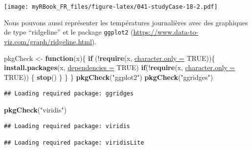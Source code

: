 \documentclass[twoside,symmetric]{book}
\newenvironment{Shaded}{}{}
\newcommand{\ControlFlowTok}[1]{\textbf{#1}}
\newcommand{\DataTypeTok}[1]{\underline{#1}}
\newcommand{\KeywordTok}[1]{\textbf{#1}}
\newcommand{\NormalTok}[1]{#1}
\newcommand{\OperatorTok}[1]{#1}
\newcommand{\OtherTok}[1]{#1}
\newcommand{\StringTok}[1]{#1}
\begin{document}
\texttt{[image: myRBook\_FR\_files/figure-latex/041-studyCase-18-2.pdf]}

Nous pouvons aussi représenter les températures journalières avec des graphiques de type ``ridgeline'' et le package \texttt{ggplot2} (\url{https://www.data-to-viz.com/graph/ridgeline.html}).

\begin{Shaded}
\begin{Highlighting}[]
\NormalTok{pkgCheck <-}\StringTok{ }\ControlFlowTok{function}\NormalTok{(x)\{ }
    \ControlFlowTok{if}\NormalTok{ (}\OperatorTok{!}\KeywordTok{require}\NormalTok{(x, }\DataTypeTok{character.only =} \OtherTok{TRUE}\NormalTok{))\{}
        \KeywordTok{install.packages}\NormalTok{(x, }\DataTypeTok{dependencies =} \OtherTok{TRUE}\NormalTok{)}
        \ControlFlowTok{if}\NormalTok{(}\OperatorTok{!}\KeywordTok{require}\NormalTok{(x, }\DataTypeTok{character.only =} \OtherTok{TRUE}\NormalTok{)) \{}
            \KeywordTok{stop}\NormalTok{()}
\NormalTok{        \}}
\NormalTok{    \}}
\NormalTok{\}}
\KeywordTok{pkgCheck}\NormalTok{(}\StringTok{"ggplot2"}\NormalTok{)}
\KeywordTok{pkgCheck}\NormalTok{(}\StringTok{"ggridges"}\NormalTok{)}
\end{Highlighting}
\end{Shaded}

\begin{verbatim}
## Loading required package: ggridges
\end{verbatim}

\begin{Shaded}
\begin{Highlighting}[]
\KeywordTok{pkgCheck}\NormalTok{(}\StringTok{"viridis"}\NormalTok{)}
\end{Highlighting}
\end{Shaded}

\begin{verbatim}
## Loading required package: viridis
\end{verbatim}

\begin{verbatim}
## Loading required package: viridisLite
\end{verbatim}
\end{document}
